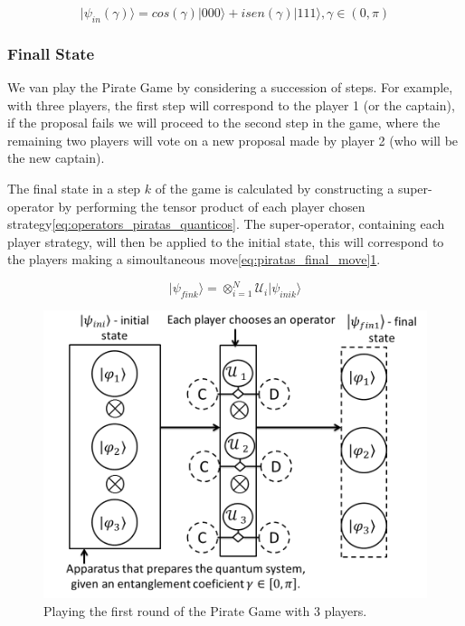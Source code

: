 \begin{equation}
\label{eq:estado_inicial_pg}
\vert \psi_{in}(\gamma) \rangle= cos( \gamma)\vert 000\rangle+ isen(\gamma)\vert 111 \rangle, \gamma \in (0,\pi)
\end{equation}



\subsubsection{Finall State}
\label{subsec:pirates_finalstate}

We van play the Pirate Game by considering a succession of steps. For example, with three players, the first step will correspond to the player 1 (or the captain), if the proposal fails we will proceed to the second step in the game, where the remaining two players will vote on a new proposal made by player 2 (who will be the new captain). 

The final state in a step $k$ of the game is calculated by constructing a super-operator by performing the tensor product of each player chosen strategy\ref{eq:operators_piratas_quanticos}. The super-operator, containing each player strategy, will then be applied to the initial state, this will correspond to the players making a simoultaneous move\ref{eq:piratas_final_move}\ref{fig:pg_architecture3players}.

\begin{equation}
\vert\psi_{fink}\rangle=\otimes_{i=1}^{N} \mathcal{U}_{i}\vert\psi_{inik}\rangle\label{eq:piratas_final_move}
\end{equation}

\begin{figure}[h]
\centering 
\includegraphics[scale=0.35]{Figures/architecture/Slide1.png}
\caption{Playing the first round of the Pirate Game with 3 players. }
\label{fig:pg_architecture3players}
\end{figure}

